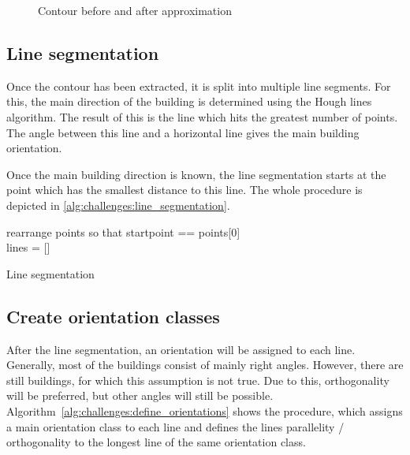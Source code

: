 \begin{figure}[H]
\begin{subfigure}{0.4\textwidth}
	\end{subfigure}
	\caption{Contour before and after approximation}
	\label{fig:challenges:contour_approximation}
\end{figure}


\subsection{Line segmentation}
Once the contour has been extracted, it is split into multiple line segments. For this, the main direction of the building is determined using the Hough lines algorithm. The result of this is the line which hits the greatest number of points. The angle between this line and a horizontal line gives the main building orientation.

Once the main building direction is known, the line segmentation starts at the point which has the smallest distance to this line. The whole procedure is depicted in \autoref{alg:challenges:line_segmentation}.

\begin{algorithm}[H]
rearrange points so that startpoint == points[0]\\
lines = []\\
\caption{Line segmentation}
\label{alg:challenges:line_segmentation}
\end{algorithm}

\subsection{Create orientation classes}
After the line segmentation, an orientation will be assigned to each line. Generally, most of the buildings consist of mainly right angles. However, there are still buildings, for which this assumption is not true. Due to this, orthogonality will be preferred, but other angles will still be possible. Algorithm~\ref{alg:challenges:define_orientations} shows the procedure, which assigns a main orientation class to each line and defines the lines parallelity / orthogonality to the longest line of the same orientation class.


